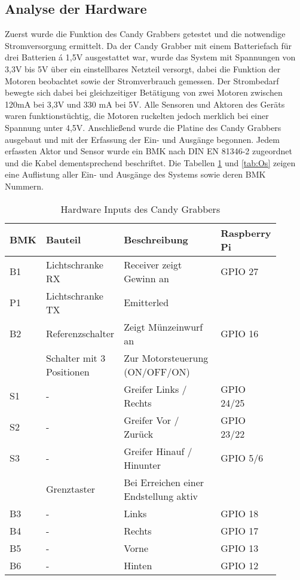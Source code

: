 \documentclass[BMR,Bachelor,ngerman]{twbook}%
\begin{document}
\subsection{Analyse der Hardware}
Zuerst wurde die Funktion des Candy Grabbers getestet und die notwendige Stromversorgung ermittelt. Da der Candy Grabber mit einem Batteriefach für drei Batterien á 1,5V ausgestattet war, wurde das System mit Spannungen von 3,3V bis 5V über ein einstellbares Netzteil versorgt, dabei die Funktion der Motoren beobachtet sowie der Stromverbrauch gemessen. Der Strombedarf bewegte sich dabei bei gleichzeitiger Betätigung von zwei Motoren zwischen 120mA bei 3,3V und 330 mA bei 5V. Alle Sensoren und Aktoren des Geräts waren funktionstüchtig, die Motoren ruckelten jedoch merklich bei einer Spannung unter 4,5V. Anschließend wurde die Platine des Candy Grabbers ausgebaut und mit der Erfassung der Ein- und Ausgänge begonnen. Jedem erfassten Aktor und Sensor wurde ein \ac{BMK} nach DIN EN 81346-2 zugeordnet und die Kabel dementsprechend beschriftet. Die Tabellen \ref{tab:Is} und \ref{tab:Os} zeigen eine Auflistung aller Ein- und Ausgänge des Systems sowie deren BMK Nummern.
\begin{table}[H]
\centering
\caption{Hardware Inputs des Candy Grabbers}\label{tab:Is}
\begin{tabular}{| p{0.08\linewidth} | p{0.27\linewidth} | p{0.4\linewidth} | p{0.15\linewidth} |}\hline
\rowcolor[gray]{0.8} BMK & Bauteil & Beschreibung & Raspberry Pi\\\hline
B1 & Lichtschranke RX & Receiver zeigt Gewinn an & GPIO 27\\
P1 & Lichtschranke TX & Emitterled &  \\\hline
B2 & Referenzschalter & Zeigt Münzeinwurf an & GPIO 16\\\hline
 & Schalter mit 3 Positionen & Zur Motorsteuerung (ON/OFF/ON) &\\
S1 & - & Greifer Links / Rechts & GPIO 24/25 \\
S2 & - & Greifer Vor / Zurück & GPIO 23/22\\
S3 & - & Greifer Hinauf / Hinunter & GPIO 5/6\\\hline
 & Grenztaster & Bei Erreichen einer Endstellung aktiv&\\
B3 & - &  Links & GPIO 18\\
B4 & - &  Rechts & GPIO 17 \\
B5 & - &  Vorne& GPIO 13\\
B6 & - &  Hinten& GPIO 12\\\hline
\end{tabular}
\end{table}
\end{document}
